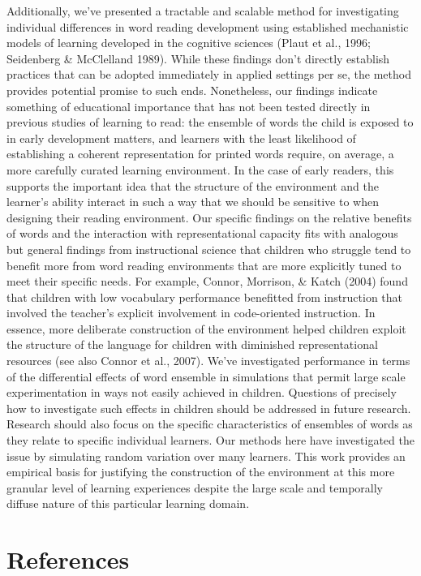 \documentclass[
  ,man,floatsintext]{apa6}
\begin{document}
Additionally, we've presented a tractable and scalable method for investigating individual differences in word reading development using established mechanistic models of learning developed in the cognitive sciences (Plaut et al., 1996; Seidenberg \& McClelland 1989). While these findings don't directly establish practices that can be adopted immediately in applied settings per se, the method provides potential promise to such ends. Nonetheless, our findings indicate something of educational importance that has not been tested directly in previous studies of learning to read: the ensemble of words the child is exposed to in early development matters, and learners with the least likelihood of establishing a coherent representation for printed words require, on average, a more carefully curated learning environment. In the case of early readers, this supports the important idea that the structure of the environment and the learner's ability interact in such a way that we should be sensitive to when designing their reading environment. Our specific findings on the relative benefits of words and the interaction with representational capacity fits with analogous but general findings from instructional science that children who struggle tend to benefit more from word reading environments that are more explicitly tuned to meet their specific needs. For example, Connor, Morrison, \& Katch (2004) found that children with low vocabulary performance benefitted from instruction that involved the teacher's explicit involvement in code-oriented instruction. In essence, more deliberate construction of the environment helped children exploit the structure of the language for children with diminished representational resources (see also Connor et al., 2007). We've investigated performance in terms of the differential effects of word ensemble in simulations that permit large scale experimentation in ways not easily achieved in children. Questions of precisely how to investigate such effects in children should be addressed in future research. Research should also focus on the specific characteristics of ensembles of words as they relate to specific individual learners. Our methods here have investigated the issue by simulating random variation over many learners. This work provides an empirical basis for justifying the construction of the environment at this more granular level of learning experiences despite the large scale and temporally diffuse nature of this particular learning domain.

\section{References}\label{references}
\end{document}
